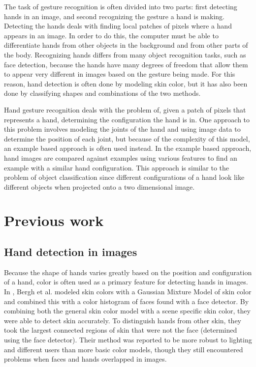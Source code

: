 \documentclass[10pt,twocolumn,letterpaper]{article}
\begin{document}
The task of gesture recognition is often divided into two parts: first detecting hands in an image, and second recognizing the gesture a hand is making. Detecting the hands deals with finding local patches of pixels where a hand appears in an image. In order to do this, the computer must be able to differentiate hands from other objects in the background and from other parts of the body. Recognizing hands differs from many object recognition tasks, such as face detection, because the hands have many degrees of freedom that allow them to appear very different in images based on the gesture being made. For this reason, hand detection is often done by modeling skin color, but it has also been done by classifying shapes and combinations of the two methods.

Hand gesture recognition deals with the problem of, given a patch of pixels that represents a hand, determining the configuration the hand is in. One approach to this problem involves modeling the joints of the hand and using image data to determine the position of each joint, but because of the complexity of this model, an example based approach is often used instead. In the example based approach, hand images are compared against examples using various features to find an example with a similar hand configuration. This approach is similar to the problem of object classification since different configurations of a hand look like different objects when projected onto a two dimensional image.

\section{Previous work}

\subsection{Hand detection in images}

Because the shape of hands varies greatly based on the position and configuration of a hand, color is often used as a primary feature for detecting hands in images. In \cite{van2009haarlet}, Bergh et al. modeled skin colors with a Gaussian Mixture Model of skin color and combined this with a color histogram of faces found with a face detector. By combining both the general skin color model with a scene specific skin color, they were able to detect skin accurately. To distinguish hands from other skin, they took the largest connected regions of skin that were not the face (determined using the face detector). Their method was reported to be more robust to lighting and different users than more basic color models, though they still encountered problems when faces and hands overlapped in images.
\end{document}
